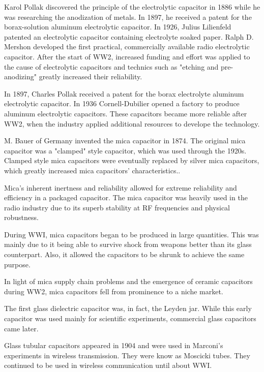 Karol Pollak discovered the principle of the electrolytic capacitor in 1886 while he was researching the anodization of metals. In 1897, he received a patent for the borax-solution aluminum electrolytic capacitor. In 1926, Julius Lilienfeld patented an electrolytic capacitor containing electrolyte soaked paper. Ralph D. Mershon developed the first practical, commercially available radio electrolytic capacitor. After the start of WW2, increased funding and effort was applied to the cause of electrolytic capacitors and technics such as "etching and pre-anodizing" greatly increased their reliability. \cite{wiki_elec}

In 1897, Charles Pollak received a patent for the borax electrolyte aluminum electrolytic capacitor. In 1936 Cornell-Dubilier opened a factory to produce aluminum electrolytic capacitors. These capacitors became more reliable after WW2, when the industry applied additional resources to develope the technology.\cite{deis_hist}

\nocite{hh_cap_table}
\nocite{capGuide_mica}
\noindent M. Bauer of Germany invented the mica capacitor in 1874. The original mica capacitor was a "clamped" style capacitor, which was used through the 1920s.\cite{wiki_mica} Clamped style mica capacitors were eventually replaced by silver mica capacitors, which greatly increased mica capacitors' characteristics.\cite{learn_caps}.

\noindent Mica's inherent inertness and reliability allowed for extreme reliability and efficiency in a packaged capacitor.\cite{tedds_mica} The mica capacitor was heavily used in the radio industry due to its superb stability at RF frequencies and physical robustness.\cite{radio_mica}

\noindent During WWI, mica capacitors began to be produced in large quantities. This was mainly due to it being able to survive shock from weapons better than its glass counterpart. Also, it allowed the capacitors to be shrunk to achieve the same purpose. \cite[f.~37-41]{dumInv}

\noindent In light of mica supply chain problems and the emergence of ceramic capacitors during WW2, mica capacitors fell from prominence to a niche market.\cite[Ch 3, Sec II]{cerMaterials}

\noindent The first glass dielectric capacitor was, in fact, the Leyden jar. While this early capacitor was used mainly for scientific experiments, commercial glass capacitors came later. 

\noindent Glass tubular capacitors appeared in 1904 and were used in Marconi's experiments in wireless transmission. They were know as Moscicki tubes. They continued to be used in wireless communication until about WWI. \cite[p.~102]{dumInv}

